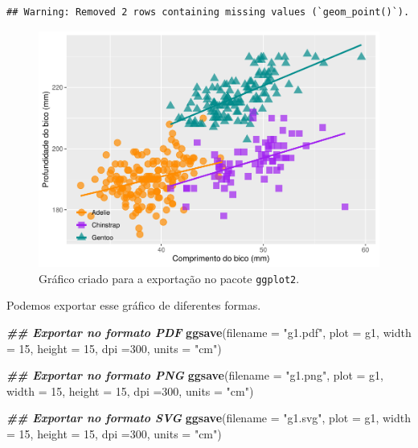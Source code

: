 \documentclass[
]{article}
\newenvironment{Shaded}{\begin{snugshade}}{\end{snugshade}}
\newcommand{\AttributeTok}[1]{\textcolor[rgb]{0.13,0.29,0.53}{#1}}
\newcommand{\DecValTok}[1]{\textcolor[rgb]{0.00,0.00,0.81}{#1}}
\newcommand{\DocumentationTok}[1]{\textcolor[rgb]{0.56,0.35,0.01}{\textbf{\textit{#1}}}}
\newcommand{\FunctionTok}[1]{\textcolor[rgb]{0.13,0.29,0.53}{\textbf{#1}}}
\newcommand{\NormalTok}[1]{#1}
\newcommand{\StringTok}[1]{\textcolor[rgb]{0.31,0.60,0.02}{#1}}
\begin{document}
\begin{verbatim}
## Warning: Removed 2 rows containing missing values (`geom_point()`).
\end{verbatim}

\begin{figure}
\centering
\includegraphics{epr_files/figure-latex/fig-plot-final-export-1.pdf}
\caption{\label{fig:fig-plot-final-export}Gráfico criado para a exportação no pacote \texttt{ggplot2}.}
\end{figure}

Podemos exportar esse gráfico de diferentes formas.

\begin{Shaded}
\begin{Highlighting}[]
\DocumentationTok{\#\# Exportar no formato PDF}
\FunctionTok{ggsave}\NormalTok{(}\AttributeTok{filename =} \StringTok{"g1.pdf"}\NormalTok{, }
       \AttributeTok{plot =}\NormalTok{ g1, }
       \AttributeTok{width =} \DecValTok{15}\NormalTok{, }
       \AttributeTok{height =} \DecValTok{15}\NormalTok{, }
       \AttributeTok{dpi =}\DecValTok{300}\NormalTok{,}
       \AttributeTok{units =} \StringTok{"cm"}\NormalTok{)}

\DocumentationTok{\#\# Exportar no formato PNG}
\FunctionTok{ggsave}\NormalTok{(}\AttributeTok{filename =} \StringTok{"g1.png"}\NormalTok{, }
       \AttributeTok{plot =}\NormalTok{ g1, }
       \AttributeTok{width =} \DecValTok{15}\NormalTok{, }
       \AttributeTok{height =} \DecValTok{15}\NormalTok{, }
       \AttributeTok{dpi =}\DecValTok{300}\NormalTok{,}
       \AttributeTok{units =} \StringTok{"cm"}\NormalTok{)}

\DocumentationTok{\#\# Exportar no formato SVG}
\FunctionTok{ggsave}\NormalTok{(}\AttributeTok{filename =} \StringTok{"g1.svg"}\NormalTok{, }
       \AttributeTok{plot =}\NormalTok{ g1, }
       \AttributeTok{width =} \DecValTok{15}\NormalTok{, }
       \AttributeTok{height =} \DecValTok{15}\NormalTok{, }
       \AttributeTok{dpi =}\DecValTok{300}\NormalTok{,}
       \AttributeTok{units =} \StringTok{"cm"}\NormalTok{)}
\end{Highlighting}
\end{Shaded}
\end{document}

